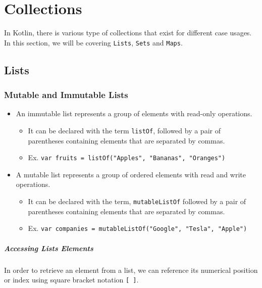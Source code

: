 \chapter{Collections}
In Kotlin, there is various type of collections that exist for different case usages. In this section, we
will be covering \verb!Lists!, \verb!Sets! and \verb!Maps!.

\section{Lists}
\subsection{Mutable and Immutable Lists}
\begin{itemize}
    \item An immutable list represents a group of elements with read-only operations.
          \begin{itemize}
              \item It can be declared with the term \verb!listOf!, followed by a pair of parentheses containing elements that are separated by commas.
              \item Ex. \verb!var fruits = listOf("Apples", "Bananas", "Oranges")!
          \end{itemize}
\end{itemize}

\begin{itemize}
    \item A mutable list represents a group of ordered elements with read and write operations.
          \begin{itemize}
              \item It can be declared with the term, \verb!mutableListOf! followed by a pair of parentheses containing elements that are separated by commas.
              \item Ex. \verb!var companies = mutableListOf("Google", "Tesla", "Apple")!
          \end{itemize}
\end{itemize}

\paragraph{Accessing Lists Elements}
In order to retrieve an element from a list, we can reference its numerical position or index using square bracket notation \verb![ ]!.

